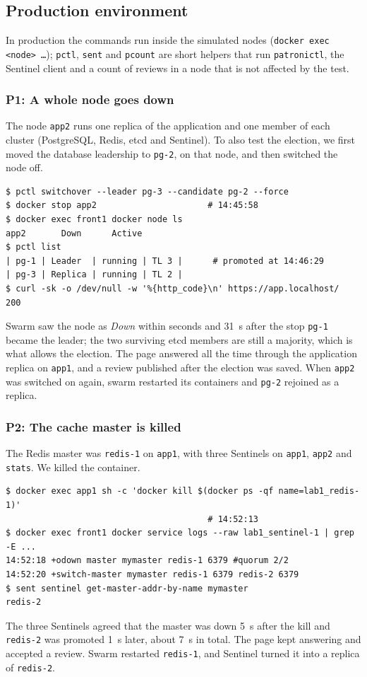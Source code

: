 \documentclass[11pt,a4paper]{article}
\newcommand{\svc}[1]{\texttt{#1}}
\begin{document}
\subsection{Production environment}

In production the commands run inside the simulated nodes (\texttt{docker exec <node>
\ldots}); \texttt{pctl}, \texttt{sent} and \texttt{pcount} are short helpers that run
\texttt{patronictl}, the Sentinel client and a count of reviews in a node that is not
affected by the test.

\subsubsection*{P1: A whole node goes down}

The node \texttt{app2} runs one replica of the application and one member of each cluster
(PostgreSQL, Redis, etcd and Sentinel). To also test the election, we first moved the
database leadership to \svc{pg-2}, on that node, and then switched the node off.
\begin{lstlisting}
$ pctl switchover --leader pg-3 --candidate pg-2 --force
$ docker stop app2                      # 14:45:58
$ docker exec front1 docker node ls
app2       Down      Active
$ pctl list
| pg-1 | Leader  | running | TL 3 |      # promoted at 14:46:29
| pg-3 | Replica | running | TL 2 |
$ curl -sk -o /dev/null -w '%{http_code}\n' https://app.localhost/
200
\end{lstlisting}
Swarm saw the node as \emph{Down} within seconds and 31~s after the stop \svc{pg-1} became
the leader; the two surviving etcd members are still a majority, which is what allows the
election. The page answered all the time through the application replica on
\texttt{app1}, and a review published after the election was saved. When \texttt{app2}
was switched on again, swarm restarted its containers and \svc{pg-2} rejoined as a
replica.

\subsubsection*{P2: The cache master is killed}

The Redis master was \svc{redis-1} on \texttt{app1}, with three Sentinels on
\texttt{app1}, \texttt{app2} and \texttt{stats}. We killed the container.
\begin{lstlisting}
$ docker exec app1 sh -c 'docker kill $(docker ps -qf name=lab1_redis-1)'
                                        # 14:52:13
$ docker exec front1 docker service logs --raw lab1_sentinel-1 | grep -E ...
14:52:18 +odown master mymaster redis-1 6379 #quorum 2/2
14:52:20 +switch-master mymaster redis-1 6379 redis-2 6379
$ sent sentinel get-master-addr-by-name mymaster
redis-2
\end{lstlisting}
The three Sentinels agreed that the master was down 5~s after the kill and \svc{redis-2}
was promoted 1~s later, about 7~s in total. The page kept answering and accepted a review.
Swarm restarted \svc{redis-1}, and Sentinel turned it into a replica of \svc{redis-2}.
\end{document}
